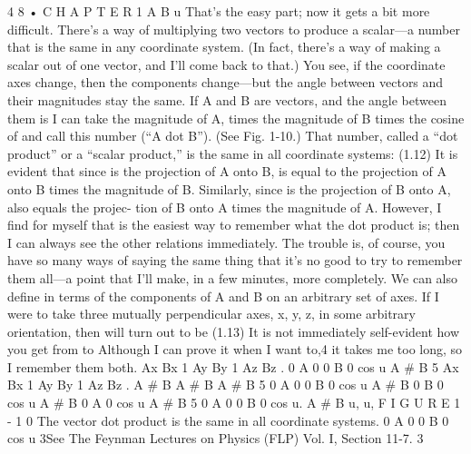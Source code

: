 \documentclass[10pt,oneside]{article}
\begin{document}
4 8 • C H A P T E R  1 A B u That’s the easy part; now it gets a bit more difficult. There’s a way of multiplying two vectors to produce a scalar---a number that is the same in any coordinate system. (In fact, there’s a way of making a scalar out of one vector, and I’ll come back to that.) You see, if the coordinate axes change, then the components change---but the angle between vectors and their magnitudes stay the same. If A and B are vectors, and the angle between them is I can take the magnitude of A, times the magnitude of B times the cosine of and call this number (“A dot B”). (See Fig. 1-10.) That number, called a “dot product” or a “scalar product,” is the same in all coordinate systems: (1.12) It is evident that since is the projection of A onto B, is equal to the projection of A onto B times the magnitude of B. Similarly, since is the projection of B onto A, also equals the projec- tion of B onto A times the magnitude of A. However, I find for myself that is the easiest way to remember what the dot product is; then I can always see the other relations immediately. The trouble is, of course, you have so many ways of saying the same thing that it’s no good to try to remember them all---a point that I’ll make, in a few minutes, more completely. We can also define in terms of the components of A and B on an arbitrary set of axes. If I were to take three mutually perpendicular axes, x, y, z, in some arbitrary orientation, then will turn out to be (1.13) It is not immediately self-evident how you get from to Although I can prove it when I want to,4 it takes me too long, so I remember them both. Ax Bx 1 Ay By 1 Az Bz . 0 A 0 0 B 0  cos u A \# B 5 Ax Bx 1 Ay By 1 Az Bz . A \# B A \# B A \# B 5 0 A 0 0 B 0  cos u A \# B 0 B 0  cos u A \# B 0 A 0  cos u A \# B 5 0 A 0 0 B 0  cos u. A \# B u, u, F I G U R E 1 - 1 0 The vector dot product is the same in all coordinate systems. 0 A 0 0 B 0  cos u 3See The Feynman Lectures on Physics (FLP) Vol. I, Section 11-7. 3\par
\end{document}
